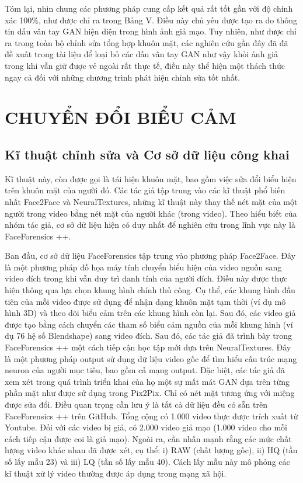 \documentclass{article}
\begin{document}
Tóm lại, nhìn chung các phương pháp cung cấp kết quả rất tốt gần với độ chính xác 100\%, như được chỉ ra trong Bảng V. Điều này chủ yếu được tạo ra do thông tin dấu vân tay GAN hiện diện trong hình ảnh giả mạo. Tuy nhiên, như được chỉ ra trong toàn bộ chỉnh sửa tổng hợp khuôn mặt, các nghiên cứu gần đây đã đã đề xuất trong tài liệu để loại bỏ các dấu vân tay GAN như vậy khỏi ảnh giả trong khi vẫn giữ được vẻ ngoài rất thực tế, điều này thể hiện một thách thức ngay cả đối với những chương trình phát hiện chỉnh sửa tốt nhất.

\section{CHUYỂN ĐỔI BIỂU CẢM}

\subsection{Kĩ thuật chỉnh sửa và Cơ sở dữ liệu công khai}

Kĩ thuật này, còn được gọi là tái hiện khuôn mặt, bao gồm việc sửa đổi biểu hiện trên khuôn mặt của người đó. Các tác giả tập trung vào các kĩ thuật phổ biến nhất Face2Face và NeuralTextures, những kĩ thuật này thay thế nét mặt của một người trong video bằng nét mặt của người khác (trong video). Theo hiểu biết của nhóm tác giả, cơ sở dữ liệu hiện có duy nhất để nghiên cứu trong lĩnh vực này là FaceForensics ++.

Ban đầu, cơ sở dữ liệu FaceForensics tập trung vào phương pháp Face2Face. Đây là một phương pháp đồ họa máy tính chuyển biểu hiện của video nguồn sang video đích trong khi vẫn duy trì danh tính của người đích. Điều này được thực hiện thông qua lựa chọn khung hình chính thủ công. Cụ thể, các khung hình đầu tiên của mỗi video được sử dụng để nhận dạng khuôn mặt tạm thời (ví dụ mô hình 3D) và theo dõi biểu cảm trên các khung hình còn lại. Sau đó, các video giả được tạo bằng cách chuyển các tham số biểu cảm nguồn của mỗi khung hình (ví dụ 76 hệ số Blendshape) sang video đích. Sau đó, các tác giả đã trình bày trong FaceForensics ++ một cách tiếp cận học tập mới dựa trên NeuralTextures. Đây là một phương pháp output sử dụng dữ liệu video gốc để tìm hiểu cấu trúc mạng neuron của người mục tiêu, bao gồm cả mạng output. Đặc biệt, các tác giả đã xem xét trong quá trình triển khai của họ một sự mất mát GAN dựa trên từng phần mặt như được sử dụng trong Pix2Pix. Chỉ có nét mặt tương ứng với miệng được sửa đổi. Điều quan trọng cần lưu ý là tất cả dữ liệu đều có sẵn trên FaceForensics ++ trên GitHub. Tổng cộng có 1.000 video thực được trích xuất từ Youtube. Đối với các video bị giả, có 2.000 video giả mạo (1.000 video cho mỗi cách tiếp cận được coi là giả mạo). Ngoài ra, cần nhấn mạnh rằng các mức chất lượng video khác nhau đã được xét, cụ thể: i) RAW (chất lượng gốc), ii) HQ (tần số lấy mẫu 23) và iii) LQ (tần số lấy mẫu 40). Cách lấy mẫu này mô phỏng các kĩ thuật xử lý video thường được áp dụng trong mạng xã hội.
\end{document}
